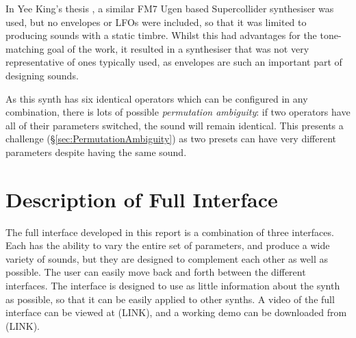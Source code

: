 \documentclass[11pt, oneside]{report}   	%
\begin{document}
In Yee King's thesis \cite{YeeKing}, a similar FM7 Ugen based Supercollider synthesiser was used, but no envelopes or LFOs were included, so that it was limited to producing sounds with a static timbre. Whilst this had advantages for the tone-matching goal of the work, it resulted in a synthesiser that was not very representative of ones typically used, as envelopes are such an important part of designing sounds. 

As this synth has six identical operators which can be configured in any combination, there is lots of possible \emph{permutation ambiguity}: if two operators have all of their parameters switched, the sound will remain identical. This presents a challenge (\S \ref{sec:PermutationAmbiguity}) as two presets can have very different parameters despite having the same sound.

\chapter{Description of Full Interface}
The full interface developed in this report is a combination of three interfaces. Each has the ability to vary the entire set of parameters, and produce a wide variety of sounds, but they are designed to complement each other as well as possible. The user can easily move back and forth between the different interfaces. The interface is designed to use as little information about the synth as possible, so that it can be easily applied to other synths. A video of the full interface can be viewed at (LINK), and a working demo can be downloaded from (LINK).
\end{document}
